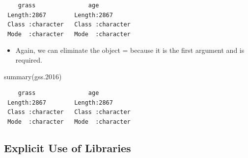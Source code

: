 \documentclass[
  letterpaper,
  DIV=11,
  numbers=noendperiod]{scrreprt}
\newenvironment{Shaded}{\begin{snugshade}}{\end{snugshade}}
\newcommand{\FloatTok}[1]{\textcolor[rgb]{0.68,0.00,0.00}{#1}}
\newcommand{\FunctionTok}[1]{\textcolor[rgb]{0.28,0.35,0.67}{#1}}
\newcommand{\NormalTok}[1]{\textcolor[rgb]{0.00,0.23,0.31}{#1}}
\providecommand{\tightlist}{%
  \setlength{\itemsep}{0pt}\setlength{\parskip}{0pt}}\usepackage{longtable,booktabs,array}
\begin{document}
\begin{verbatim}
    grass               age           
 Length:2867        Length:2867       
 Class :character   Class :character  
 Mode  :character   Mode  :character  
\end{verbatim}

\begin{itemize}
\tightlist
\item
  Again, we can eliminate the object = because it is the first argument
  and is required.
\end{itemize}

\begin{Shaded}
\begin{Highlighting}[]
\FunctionTok{summary}\NormalTok{(gss}\FloatTok{.2016}\NormalTok{)}
\end{Highlighting}
\end{Shaded}

\begin{verbatim}
    grass               age           
 Length:2867        Length:2867       
 Class :character   Class :character  
 Mode  :character   Mode  :character  
\end{verbatim}

\subsection{Explicit Use of Libraries}\label{explicit-use-of-libraries}
\end{document}
